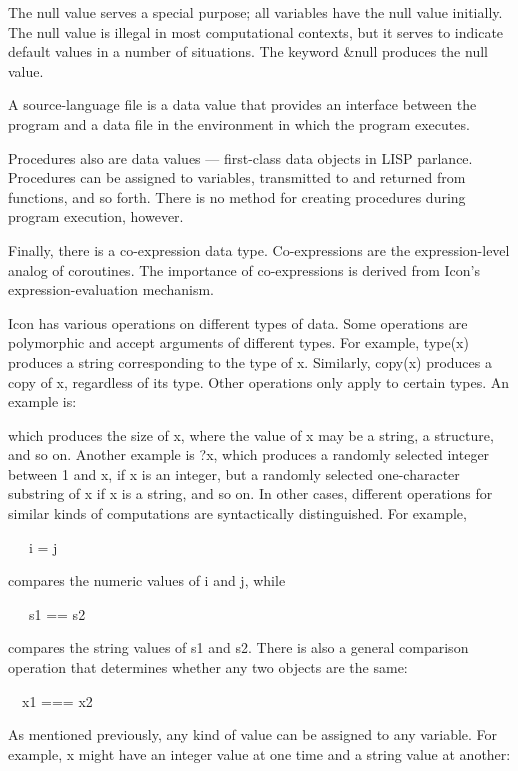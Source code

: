 The null value serves a special purpose; all variables have the null value initially. The null value is illegal in most
computational contexts, but it serves to indicate default values in a number of situations. The keyword \&null produces
the null value.

A source-language file is a data value that provides an interface
between the program and a data file in the environment in which the
program executes.

Procedures also are data values --- {\textquotedbl}first-class data
objects{\textquotedbl} in LISP parlance.  Procedures can be assigned
to variables, transmitted to and returned from functions, and so
forth. There is no method for creating procedures during program
execution, however.

Finally, there is a co-expression data type. Co-expressions are the
expression-level analog of coroutines. The importance of
co-expressions is derived from Icon's expression-evaluation mechanism.

Icon has various operations on different types of data. Some
operations are polymorphic and accept arguments of different
types. For example, type(x) produces a string corresponding to the
type of x. Similarly, copy(x) produces a copy of x, regardless of its
type. Other operations only apply to certain types. An example is:



\noindent which produces the size of x, where the value of x may be a
string, a structure, and so on. Another example is ?x, which produces
a randomly selected integer between 1 and x, if x is an integer, but a
randomly selected one-character substring of x if x is a string, and
so on. In other cases, different operations for similar kinds of
computations are syntactically distinguished. For example,

{\ttfamily\mdseries
\ \ \ i = j}

\noindent compares the numeric values of i and j, while

{\ttfamily\mdseries
\ \ \ s1 == s2}


\noindent compares the string values of s1 and s2. There is also a
general comparison operation that determines whether any two objects
are the same:

{\ttfamily\mdseries
\ \ x1 === x2}

As mentioned previously, any kind of value can be assigned to any
variable. For example, x might have an integer value at one time and a
string value at another:

